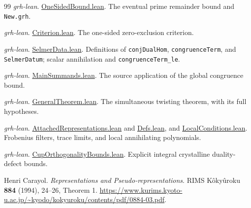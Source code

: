 \begin{thebibliography}{99}
\emph{grh-lean}.
\href{https://github.com/lsernau/grh-lean/blob/72fead102f663d5c7a407964a13dc0cf9d977207/grh/src/New/Reduction/OneSidedBound.lean}{OneSidedBound.lean}.
The eventual prime remainder bound and \texttt{New.grh}.

\emph{grh-lean}.
\href{https://github.com/lsernau/grh-lean/blob/72fead102f663d5c7a407964a13dc0cf9d977207/grh/src/New/Reduction/Zeros/Criterion.lean}{Criterion.lean}.
The one-sided zero-exclusion criterion.

\emph{grh-lean}.
\href{https://github.com/lsernau/grh-lean/blob/72fead102f663d5c7a407964a13dc0cf9d977207/grh/src/New/Congruences/Selmer/SelmerData.lean}{SelmerData.lean}.
Definitions of \texttt{conjDualHom}, \texttt{congruenceTerm},
and \texttt{SelmerDatum}; scalar annihilation and
\texttt{congruenceTerm\_le}.

\emph{grh-lean}.
\href{https://github.com/lsernau/grh-lean/blob/72fead102f663d5c7a407964a13dc0cf9d977207/grh/src/New/Congruences/Selmer/MainSummands.lean}{MainSummands.lean}.
The source application of the global congruence bound.

\emph{grh-lean}.
\href{https://github.com/lsernau/grh-lean/blob/72fead102f663d5c7a407964a13dc0cf9d977207/grh/src/New/Congruences/Selmer/GeneralTheorem.lean}{GeneralTheorem.lean}.
The simultaneous twisting theorem, with its full hypotheses.

\emph{grh-lean}.
\href{https://github.com/lsernau/grh-lean/blob/72fead102f663d5c7a407964a13dc0cf9d977207/grh/src/Lib/GaloisRep/Main/AttachedRepresentations.lean}{AttachedRepresentations.lean}
and
\href{https://github.com/lsernau/grh-lean/blob/72fead102f663d5c7a407964a13dc0cf9d977207/grh/src/Lib/GaloisRep/Main/Defs.lean}{Defs.lean}, and
\href{https://github.com/lsernau/grh-lean/blob/72fead102f663d5c7a407964a13dc0cf9d977207/grh/src/Lib/GaloisRep/Main/LocalConditions.lean}{LocalConditions.lean}.
Frobenius filters, trace limits, and local annihilating polynomials.

\emph{grh-lean}.
\href{https://github.com/lsernau/grh-lean/blob/72fead102f663d5c7a407964a13dc0cf9d977207/grh/src/New/Congruences/Lifting/CupOrthogonalityBounds.lean}{CupOrthogonalityBounds.lean}.
Explicit integral crystalline duality-defect bounds.

Henri Carayol.
\emph{Representations and Pseudo-representations}.
RIMS K\^oky\^uroku \textbf{884} (1994), 24--26, Theorem 1.
\url{https://www.kurims.kyoto-u.ac.jp/~kyodo/kokyuroku/contents/pdf/0884-03.pdf}.


\end{thebibliography}
